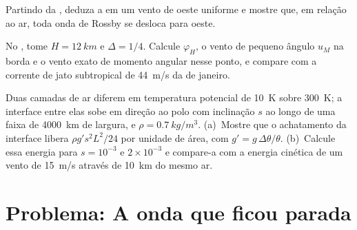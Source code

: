 \begin{exercise}[$\star\star\star$]\label{exo:b3:atmospheric-dynamics:10}
Partindo da , deduza a  em um vento de oeste uniforme e mostre que, em relação
ao ar, toda onda de Rossby se desloca para oeste.
\end{exercise}

\begin{exercise}[$\star\star\star$]\label{exo:b3:atmospheric-dynamics:11}
No , tome $H = \qty{12}{km}$ e $\Delta = 1/4$. Calcule
$\varphi_H$, o vento de pequeno ângulo $u_M$ na borda e o vento exato de momento angular
nesse ponto, e compare com a corrente de jato subtropical de
\qty{44}{m/s} da  de janeiro.
\end{exercise}

\begin{exercise}[$\star\star\star$]\label{exo:b3:atmospheric-dynamics:12}
Duas camadas de ar diferem em temperatura potencial de \qty{10}{K} sobre \qty{300}{K};
a interface entre elas sobe em direção ao polo com inclinação $s$
ao longo de uma faixa de \qty{4000}{km} de largura, e $\rho = \qty{0.7}{kg/m^3}$. (a)~Mostre
que o achatamento da interface libera $\rho g' s^2L^2/24$ por unidade
de área, com $g' = g\,\Delta\theta/\theta$. (b)~Calcule essa energia para $s = 10^{-3}$ e
$2\times10^{-3}$ e compare-a com a energia cinética de um vento de \qty{15}{m/s}
através de \qty{10}{km} do mesmo ar.
\end{exercise}

\section{Problema: A onda que ficou parada}

